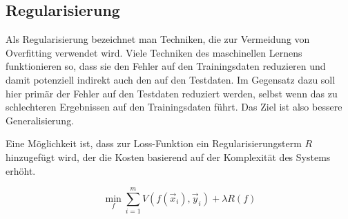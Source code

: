 
\subsection{Regularisierung} \label{ssec:Regul}


Als Regularisierung bezeichnet man Techniken, die zur Vermeidung von Overfitting verwendet wird.
Viele Techniken des maschinellen Lernens funktionieren so, dass sie den Fehler auf den Trainingsdaten reduzieren und damit potenziell indirekt auch den auf den Testdaten.
Im Gegensatz dazu soll hier primär der Fehler auf den Testdaten reduziert werden, selbst wenn das zu schlechteren Ergebnissen auf den Trainingsdaten führt.
Das Ziel ist also bessere Generalisierung.

Eine Möglichkeit ist, dass zur Loss-Funktion ein Regularisierungsterm \(R\) hinzugefügt wird, 
der die Kosten basierend auf der Komplexität des Systems erhöht.
 
\begin{equation}
	\min_f \sum\limits_{i=1}^{m} V(f(\vec{x}_i), \vec{y}_i) + \lambda R(f)
\end{equation} 
 
